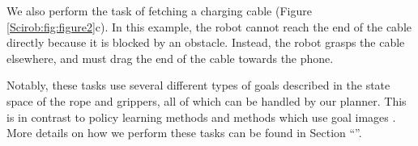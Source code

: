 We also perform the task of fetching a charging cable (Figure \ref{Scirob:fig:figure2}c). In this example, the robot cannot reach the end of the cable directly because it is blocked by an obstacle. Instead, the robot grasps the cable elsewhere, and must drag the end of the cable towards the phone.

Notably, these tasks use several different types of goals described in the state space of the rope and grippers, all of which can be handled by our planner. This is in contrast to policy learning methods \cite{matas2018sim2real,Sundaresan2020,Wu2020} and methods which use goal images \cite{Nair2017,Finn2017,Zhang2019}. More details on how we perform these tasks can be found in Section ``''.

\FloatBarrier

